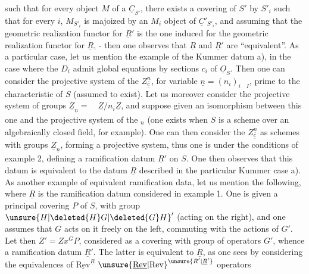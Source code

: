 such that for every object $M$ of a $\underline{C}_{S'}$, there exists a covering of $S'$ by $S'_i$ such that for every $i$, $M_{S'_i}$ is  majoized by an $M_i$ object of $\underline{C}'_{S'_i}$,  and assuming that the geometric realization functor for $\underline{R}'$ is the one induced for the geometric realization functor for $\underline{R}$, - then one observes that $\underline{R}$ and $\underline{R}'$ are ``equivalent''. As a particular case, let us mention the example of the Kummer datum a), in the case where the $D_i$ admit global equations by sections $c_i$ of $\underline{O}_S$. Then one can consider the projective system of the $Z_{\underline{c}}^{\underline{n}}$, for variable $\underline{n}=(n_i)_{i\quad I}$, prime  to the characteristic of $S$ (assumed to exist). Let us moreover consider the projective system of groups $\underline{Z}_{\underline{n}}=\quad\underline{Z}/n_i\underline{Z}$, and suppose given an isomorphism between this one and the projective system of the ${}_{\underline{n}}$ (one exists when $S$ is a scheme over an algebraically closed field, for example). One can then consider the $Z_{\underline{c}}^{\underline{n}}$ as schemes with groups $\underline{Z}_{\underline{n}}$, forming a projective system,  thus one is under the conditions of example 2, defining a ramification datum $\underline{R}'$ on $S$. One then observes that this datum is equivalent to the datum $\underline{R}$ described in the particular Kummer case a). As another example of equivalent ramification data, let us mention the following, where $\underline{R}$ is the ramification datum considered in example 1. One is given a principal covering $P$ of $S$, with group $\unsure{H|\deleted{H}G|\deleted{G}H}'$ (acting on the right), and one assumes that $G$ acts on it freely on the left, commuting with the actions of $G'$. Let then $Z'=Zx^{G}P$, considered as a covering with group of operators $G'$, whence a ramification datum $\underline{R}'$. The latter is equivalent to $\underline{R}$, as one sees by considering the equivalences  of   $\underline{\mathrm{Rev}}^{\underline{R}}$  ${\unsure{\underline{\mathrm{Rev}}|\mathrm{Rev}}}^{\unsure{R'|\underline{R}'}}$ operators 
